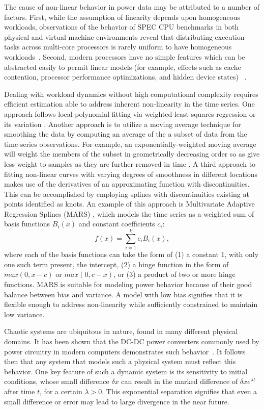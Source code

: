 The cause of non-linear behavior in power data may be attributed to a
number of factors.  First, while the assumption of linearity depends
upon homogeneous workloads, observations of the behavior of SPEC CPU
benchmarks in both physical and virtual machine environments reveal that
distributing execution tasks across multi-core processors is rarely
uniform to have homogeneous workloads~\cite{Kansal2010}.  Second, modern
processors have no simple features which can be abstracted
easily to permit linear models (for example, effects such as cache
contention, processor performance optimizations, and hidden device
states) ~\cite{McCullough2011}.

Dealing with workload dynamics without high computational complexity
requires efficient estimation able to address inherent non-linearity in
the time series.  One approach follows local polynomial fitting via
weighted least squares regression \cite{Fan1996} or its variation
\cite{Singh2009}.  Another approach is to utilize a moving average
technique for smoothing the data by computing an average of the a subset
of data from the time series observations.  For example, an
exponentially-weighted moving average will weight the members of the
subset in geometrically decreasing order so as give less weight to
samples as they are further removed in time \cite{NIST2010}. A third
approach to fitting non-linear curves with varying degrees of smoothness
in different locations makes use of the derivatives of an approximating
function with discontinuities.  This can be accomplished by employing
splines with discontinuities existing at points identified as knots.  An
example of this approach is Multivariate Adaptive Regression Splines
(MARS) \cite{Friedman1991}, which models the time series as a weighted
sum of basis functions $B_{i}(x)$ and constant coefficients $c_{i}$:
\begin{equation}
  \label{eq:mars}
  f(x)= \displaystyle\sum_{i=1}^{k}c_{i}B_{i}(x),
\end{equation}
where each of the basis functions can take the form of (1) a constant 1,
with only one such term present, the intercept, (2) a hinge function in
the form of $max(0,x - c)$ or $max(0, c - x)$, or (3) a product of two or
more hinge functions.   MARS is suitable for modeling power
behavior because of their good balance between bias and variance.
A model with low bias signifies that it is flexible enough to address
non-linearity while sufficiently constrained to maintain low variance.

Chaotic systems are ubiquitous in nature, found in many different
physical domains.  It has been shown that the DC-DC power converters
commonly used by power circuitry in modern computers demonstrates such
behavior~\cite{Hamill1997,Tse2002}.  It follows then that any system
that models such a physical system must reflect this behavior. One key
feature of such a dynamic system is its sensitivity to initial
conditions, whose small difference $\delta{x}$ can result in the marked
difference of $\delta{x}e^{\lambda t}$ after time $t$, for a certain
$\lambda > 0$.  This exponential separation signifies that even a small
difference or error may lead to large divergence in the near future.

